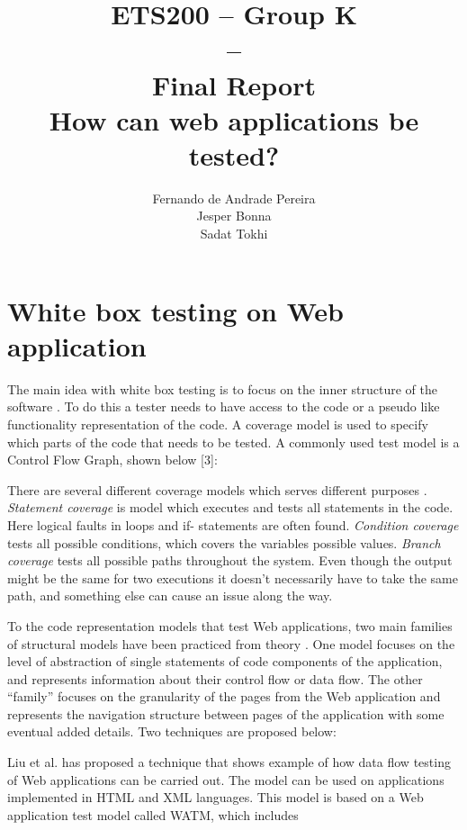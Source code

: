 \documentclass[a4paper]{article}
\title{ETS200 -- Group K\\--\\ Final Report \\
How can web applications be tested?
}
\author{Fernando de Andrade Pereira
\\Jesper Bonna
\\Sadat Tokhi
}
\begin{document}
\maketitle
\thispagestyle{empty}
\clearpage

\tableofcontents
\thispagestyle{empty}
\clearpage

\setcounter{page}{1}

\section{White box testing on Web application}
The main idea with white box testing is to focus on the inner structure of the software \cite{ib03}. To do this
a tester needs to have access to the code or a pseudo like functionality representation of the code. A
coverage model is used to specify which parts of the code that needs to be tested. A commonly used
test model is a Control Flow Graph, shown below [3]:

There are several different coverage models which serves different purposes \cite{ib03}. \emph{Statement coverage}
is model which executes and tests all statements in the code. Here logical faults in loops and if-
statements are often found. \emph{Condition coverage} tests all possible conditions, which covers the
variables possible values. \emph{Branch coverage} tests all possible paths throughout the system. Even
though the output might be the same for two executions it doesn’t necessarily have to take the same
path, and something else can cause an issue along the way.

To the code representation models that test Web applications, two main families of structural
models have been practiced from theory \cite{dlf06}. One model focuses on the level of abstraction of
single statements of code components of the application, and represents information about their
control flow or data flow. The other “family” focuses on the granularity of the pages from the Web
application and represents the navigation structure between pages of the application with some
eventual added details. Two techniques are proposed below:

Liu et al.\cite{lkhh01} has proposed a technique that shows example of how data flow testing of Web
applications can be carried out. The model can be used on applications implemented in HTML and
XML languages. This model is based on a Web application test model called WATM, which includes
\end{document}
